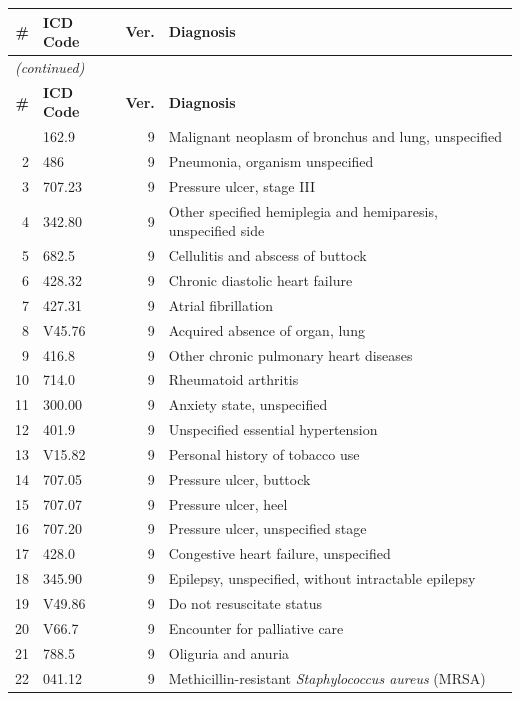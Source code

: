 \documentclass[12pt, a4paper]{article}
\begin{document}
\medskip
{\scriptsize\setlength{\tabcolsep}{4pt}
\begin{longtable}{r l r p{8cm}}
\toprule
\textbf{\#} & \textbf{ICD Code} & \textbf{Ver.} & \textbf{Diagnosis} \\
\midrule
\endfirsthead
\multicolumn{4}{l}{\small\itshape (continued)} \\
\toprule
\textbf{\#} & \textbf{ICD Code} & \textbf{Ver.} & \textbf{Diagnosis} \\
\midrule
\endhead
\bottomrule
\endlastfoot
 1 & 162.9   & 9 & Malignant neoplasm of bronchus and lung, unspecified \\
 2 & 486     & 9 & Pneumonia, organism unspecified \\
 3 & 707.23  & 9 & Pressure ulcer, stage III \\
 4 & 342.80  & 9 & Other specified hemiplegia and hemiparesis, unspecified side \\
 5 & 682.5   & 9 & Cellulitis and abscess of buttock \\
 6 & 428.32  & 9 & Chronic diastolic heart failure \\
 7 & 427.31  & 9 & Atrial fibrillation \\
 8 & V45.76  & 9 & Acquired absence of organ, lung \\
 9 & 416.8   & 9 & Other chronic pulmonary heart diseases \\
10 & 714.0   & 9 & Rheumatoid arthritis \\
11 & 300.00  & 9 & Anxiety state, unspecified \\
12 & 401.9   & 9 & Unspecified essential hypertension \\
13 & V15.82  & 9 & Personal history of tobacco use \\
14 & 707.05  & 9 & Pressure ulcer, buttock \\
15 & 707.07  & 9 & Pressure ulcer, heel \\
16 & 707.20  & 9 & Pressure ulcer, unspecified stage \\
17 & 428.0   & 9 & Congestive heart failure, unspecified \\
18 & 345.90  & 9 & Epilepsy, unspecified, without intractable epilepsy \\
19 & V49.86  & 9 & Do not resuscitate status \\
20 & V66.7   & 9 & Encounter for palliative care \\
21 & 788.5   & 9 & Oliguria and anuria \\
22 & 041.12  & 9 & Methicillin-resistant \textit{Staphylococcus aureus} (MRSA) \\
\end{longtable}
}
\end{document}
